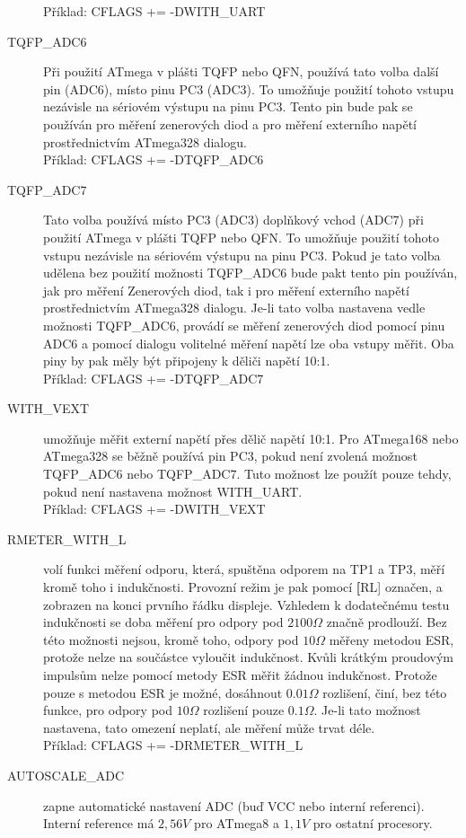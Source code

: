 \begin{description}
Příklad: CFLAGS += -DWITH\_UART
  \item[TQFP\_ADC6] Při použití ATmega v plášti TQFP nebo QFN, používá tato volba další pin (ADC6),
místo pinu PC3 (ADC3).
To umožňuje použití tohoto vstupu nezávisle na sériovém výstupu na pinu PC3.
Tento pin bude pak se používán pro měření zenerových diod a pro měření externího napětí
prostřednictvím  ATmega328 dialogu.\\
Příklad: CFLAGS += -DTQFP\_ADC6
  \item[TQFP\_ADC7] Tato volba používá místo PC3 (ADC3) doplňkový vchod (ADC7) při použití
ATmega v plášti TQFP nebo QFN.
To umožňuje použití tohoto vstupu nezávisle na sériovém výstupu na pinu PC3.
Pokud je tato volba udělena bez použití možnosti TQFP\_ADC6 bude pakt tento pin používán,
jak pro měření Zenerových diod, tak i pro měření externího napětí prostřednictvím ATmega328 dialogu.
Je-li tato volba nastavena vedle možnosti TQFP\_ADC6, provádí se měření zenerových diod
pomocí pinu ADC6 a  pomocí dialogu volitelné měření napětí lze oba vstupy měřit.
Oba piny by pak měly být připojeny k děliči napětí 10:1.\\
Příklad: CFLAGS += -DTQFP\_ADC7
  \item[WITH\_VEXT]  umožňuje měřit externí napětí přes dělič napětí 10:1.
Pro ATmega168 nebo ATmega328 se běžně používá pin PC3,
pokud není zvolená možnost TQFP\_ADC6 nebo TQFP\_ADC7.
Tuto možnost lze použít pouze tehdy, pokud není nastavena možnost WITH\_UART.\\
Příklad: CFLAGS += -DWITH\_VEXT 
  \item[RMETER\_WITH\_L] volí funkci měření odporu, která, spuštěna odporem na TP1 a TP3,
měří kromě toho i indukčnosti.
Provozní režim je pak pomocí {\textbf[RL]} označen, a zobrazen na konci prvního řádku displeje.
Vzhledem k dodatečnému testu indukčnosti se doba měření pro odpory pod \(2100\Omega\) značně prodlouží.
Bez této možnosti nejsou, kromě toho, odpory pod \(10\Omega\) měřeny metodou ESR,
protože  nelze na součástce vyloučit indukčnost.
Kvůli krátkým proudovým impulsům nelze pomocí metody ESR měřit žádnou indukčnost.
Protože pouze s metodou ESR je možné, dosáhnout \(0.01\Omega\) rozlišení, činí, bez této funkce,
pro odpory pod \(10\Omega\) rozlišení pouze \(0.1\Omega\).
Je-li tato možnost nastavena, tato omezení neplatí, ale měření může trvat déle.\\
Příklad: CFLAGS += -DRMETER\_WITH\_L
  \item[AUTOSCALE\_ADC] zapne automatické nastavení ADC (buď VCC nebo interní referenci).
Interní reference má \(2,56V\) pro ATmega8 a \(1,1V\) pro ostatní procesory.

\end{description}
